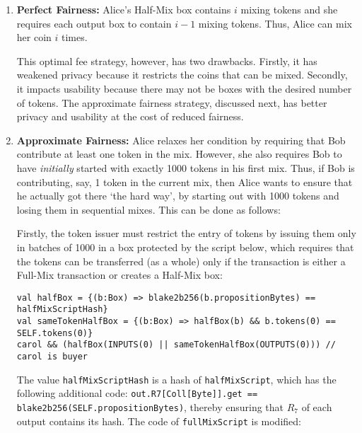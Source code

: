 \documentclass[11pt]{article}
\begin{document}
\begin{enumerate}
	\item \textbf{Perfect Fairness:} 
 Alice's Half-Mix box contains $i$ mixing tokens and she requires each output box to contain $i-1$ mixing tokens. Thus, Alice can mix her coin $i$ times. 
 
 This optimal fee strategy, however, has two drawbacks. Firstly, it has weakened privacy because it restricts the coins that can be mixed. Secondly, it impacts usability because there may not be boxes with the desired number of tokens. The approximate fairness strategy, discussed next, has better privacy and usability at the cost of reduced fairness.
 
 \item \textbf{Approximate Fairness:} Alice relaxes her condition by requiring that Bob contribute at least one token in the mix. %
 However, 
she also requires Bob to have {\em initially} started with exactly 1000 tokens in his first mix. Thus, if Bob is contributing, say, 1 token in the current mix, then Alice wants to ensure that he actually got there `the hard way', by starting out with 1000 tokens and losing them in sequential mixes. %
This can be done as follows:

Firstly, the token issuer must restrict the entry of tokens by issuing them only in batches of 1000 in a box protected by the script below,
which requires that the tokens can be transferred (as a whole) only if the transaction is either a Full-Mix transaction or creates a Half-Mix box: 
\begin{verbatim}
val halfBox = {(b:Box) => blake2b256(b.propositionBytes) == halfMixScriptHash}
val sameTokenHalfBox = {(b:Box) => halfBox(b) && b.tokens(0) == SELF.tokens(0)}
carol && (halfBox(INPUTS(0) || sameTokenHalfBox(OUTPUTS(0))) // carol is buyer
\end{verbatim}

The value \texttt{halfMixScriptHash} is a hash of \texttt{halfMixScript}, which has the following additional code: 
\texttt{out.R7[Coll[Byte]].get == blake2b256(SELF.propositionBytes)}, thereby ensuring that $R_7$ of each output contains its hash. The code of \texttt{fullMixScript} is modified:


\end{enumerate}
\end{document}
